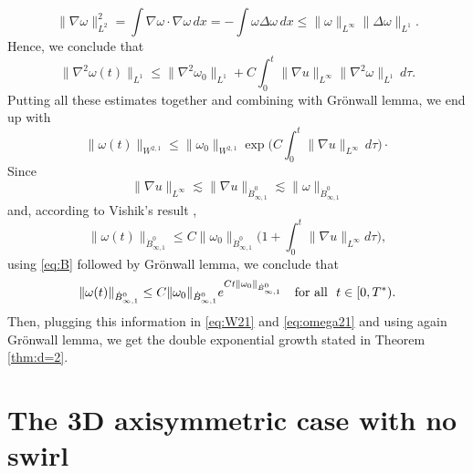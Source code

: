 \documentclass[11pt]{amsart}
\numberwithin{equation}{section}
\begin{document}
 $$ \|\nabla\omega\|_{L^2}^2=\int \nabla\omega \cdot\nabla \omega\,dx =-\int\omega\Delta\omega\,dx
 \leq \|\omega\|_{L^\infty}\|\Delta\omega\|_{L^1}.$$
 Hence, we conclude that 
  $$
 \|\nabla^2\omega(t)\|_{L^1}\leq \|\nabla^2\omega_0\|_{L^1}+C\int_0^t\|\nabla u\|_{L^\infty}\|\nabla^2\omega\|_{L^1}\,d\tau.$$
 Putting all these estimates together and combining with Gr\"onwall lemma, we end up with 
 \begin{equation}\label{eq:omega21}
\|\omega(t)\|_{W^{2,1}}\leq \|\omega_0\|_{W^{2,1}} \exp\biggl( C\int_0^t\|\nabla u\|_{L^\infty}\,d\tau \biggr)\cdotp\end{equation}
Since 
\begin{equation}\label{eq:B}
\|\nabla u\|_{L^\infty}\lesssim \|\nabla u\|_{\dot B^0_{\infty,1}}\lesssim \|\omega\|_{\dot B^0_{\infty,1}}\end{equation}
and,  according to Vishik's result \cite{Vishik}, 
 $$\|\omega(t)\|_{\dot B^0_{\infty,1}} \leq C \|\omega_0\|_{\dot B^0_{\infty,1}}\biggl(1+\int_0^t\|\nabla u\|_{L^\infty} d\tau \biggr),$$
  using \eqref{eq:B} followed by Gr\"onwall lemma, we conclude that
 $$ \|\omega(t)\|_{\dot B^0_{\infty,1}}\leq C\|\omega_0\|_{\dot B^0_{\infty,1}}e^{Ct \|\omega_0\|_{\dot B^0_{\infty,1}}}
 \quad\hbox{for all }\ t\in[0,T^*).$$
 Then, plugging this information in \eqref{eq:W21} and \eqref{eq:omega21} and using 
 again Gr\"onwall lemma, we get the double exponential growth stated in 
 Theorem \ref{thm:d=2}. 
  




\section{The 3D axisymmetric case with no swirl}\label{s:axi}
\end{document}
